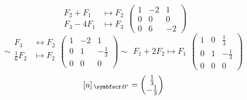 \begin{enumerate}[label=\listAlph]
\[\begin{aligned}
                    F_2 + F_1 &\mapsto F_2 \\
                    F_3 - 4F_1 &\mapsto F_3
                \end{aligned}
                \left(
                \begin{array}{cc|c}
                    1 & -2 & 1 \\
                    0 & 0 & 0  \\
                    0 & 6 & -2
                \end{array}
                \right)
            \]
            \[
                \sim
                \begin{aligned}
                    F_3 &\leftrightarrow F_2 \\
                    \frac{1}{6}F_2 &\mapsto F_2 \\
                \end{aligned}
                \left(
                \begin{array}{cc|c}
                    1 & -2 & 1 \\
                    0 & 1 & -\frac{1}{3} \\
                    0 & 0 & 0 
                \end{array}
                \right)
                \sim
                \begin{aligned}
                    F_1 + 2F_2 \mapsto F_1
                \end{aligned}
                \left(
                \begin{array}{cc|c}
                    1 & 0 & \frac{1}{3} \\
                    0 & 1 & -\frac{1}{3} \\
                    0 & 0 & 0 
                \end{array}
                \right)
            \]
            \[
                \veccoord{u}{\fb'} = \fvec{\frac{1}{3}, -\frac{1}{3}}
            \]
    \end{enumerate}
